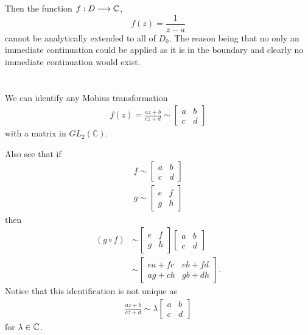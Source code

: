 \documentclass{unswmaths}
\begin{document}
Then the function $ f : D \longrightarrow \mathbb{C} $, $$ f(z) = \frac{1}{z-a} $$ cannot be analytically extended to all of $ D_0 $. The reason being that no only an immediate continuation could be applied as it is in the boundary and clearly no immediate continuation would exist.


\section{}

We can identify any Mobius transformation 
\begin{align}
    f(z) = \frac{az + b}{cz + d} \sim \left[ \begin{array}{cc} a & b \\ c & d \end{array}\right]
\end{align}
with a matrix in $ GL_2(\mathbb{C}) $.

Also see that if
\begin{align}
    f \sim \left[ \begin{array}{cc} a & b \\ c & d \end{array}\right] \\
    g \sim \left[ \begin{array}{cc} e & f \\ g & h \end{array}\right] 
\end{align}
then
\begin{align}
    (g \circ f) &\sim \left[ \begin{array}{cc} e & f \\ g & h \end{array}\right] \left[ \begin{array}{cc} a & b \\ c & d \end{array} \right] \\
    &\sim \left[ \begin{array}{cc} ea + fc & eb + fd \\ ag + ch & gb + dh\end{array}\right].
\end{align}
Notice that this identification is not unique as
\begin{align}
    \frac{az + b}{cz+d} \sim \lambda\left[ \begin{array}{cc} a & b \\ c & d \end{array}\right]
\end{align}
for $ \lambda \in \mathbb{C} $.
\end{document}
